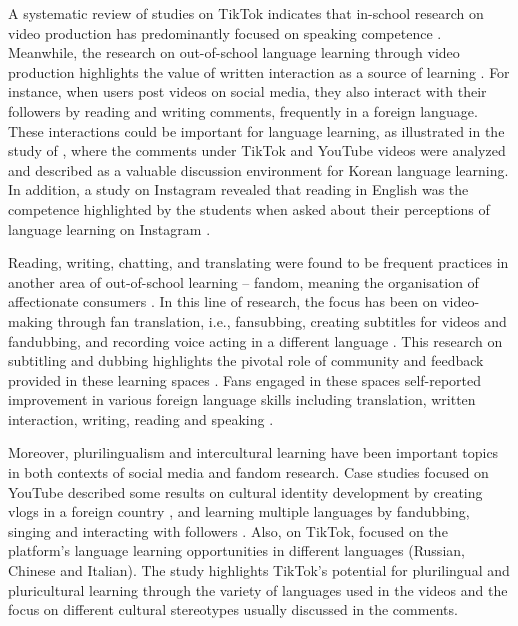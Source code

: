 A systematic review of studies on TikTok indicates that in-school
research on video production has predominantly focused on speaking
competence \cite{tan2022}. Meanwhile, the research on
out-of-school language learning through video production highlights the
value of written interaction as a source of learning \cite{cassany2021}. For instance, when users post videos on social media,
they also interact with their followers by reading and writing comments,
frequently in a foreign language. These interactions could be important
for language learning, as illustrated in the study of \textcite{vazquez-calvo2023}, where the comments under TikTok and YouTube videos
were analyzed and described as a valuable discussion environment for
Korean language learning. In addition, a study on Instagram revealed
that reading in English was the competence highlighted by the students
when asked about their perceptions of language learning on Instagram
\cite{gonulal2019}.

Reading, writing, chatting, and translating were found to be frequent
practices in another area of out-of-school learning -- fandom, meaning
the organisation of affectionate consumers \cite{sauro2017}. In this line
of research, the focus has been on video-making through fan translation,
i.e., fansubbing, creating subtitles for videos \cite{tee2022} and fandubbing, and recording voice acting in a different language
\cite{shafirova2019}. This research on subtitling and dubbing
highlights the pivotal role of community and feedback provided in these
learning spaces \cite{zhang2016}. Fans engaged in these spaces
self-reported improvement in various foreign language skills including
translation, written interaction, writing, reading and speaking \cite{benson2015,shafirova2019}.

Moreover, plurilingualism and intercultural learning have been important
topics in both contexts of social media and fandom research. Case
studies focused on YouTube described some results on cultural identity
development by creating vlogs in a foreign country \cite{chang2019}, and learning multiple languages by fandubbing, singing and
interacting with followers \cite{zhang2022}. Also, on
TikTok, \textcite{vazquez2022} focused on the platform's
language learning opportunities in different languages (Russian, Chinese
and Italian). The study highlights TikTok's potential for plurilingual
and pluricultural learning through the variety of languages used in the
videos and the focus on different cultural stereotypes usually discussed
in the comments.

